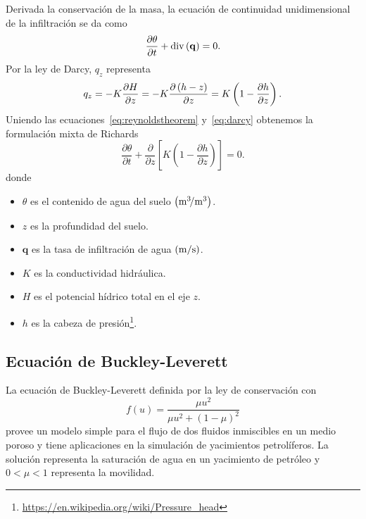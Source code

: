 Derivada la conservación de la masa, la ecuación de continuidad
unidimensional de la infiltración se da como~\cite{Tan2018}
\begin{equation}\label{eq:reynoldstheorem}
	\diffp{\theta}{t}+
	\operatorname{div}\left(\mathbf{q}\right)=
	0.
\end{equation}
Por la ley de Darcy, $q_{z}$ representa
\begin{equation}\label{eq:darcy}
	q_{z}=
	-K\diffp{H}{z}=
	-K\diffp{\left(h-z\right)}{z}=
	K\left(
	1-
	\diffp{h}{z}
	\right).
\end{equation}
Uniendo las ecuaciones~\eqref{eq:reynoldstheorem} y~\eqref{eq:darcy}
obtenemos la formulación mixta de Richards
\begin{equation*}
	\frac{\partial\theta}{\partial t}+
	\frac{\partial}{\partial z}
	\left[K\left(1-\frac{\partial h}{\partial z}\right)\right]=0.
\end{equation*}
donde
\begin{itemize}
	\item

	      $\theta$ es el contenido de agua del suelo $\left(\unit[per-mode=symbol]{\cubic\metre\per\cubic\metre}\right)$.

	\item

	      $z$ es la profundidad del suelo.

	\item

	      $\mathbf{q}$ es la tasa de infiltración de agua $\left(\unit[per-mode=symbol]{\metre\per\second}\right)$.

	\item

	      $K$ es la conductividad hidráulica.

	\item

	      $H$ es el potencial hídrico total en el eje $z$.

	\item

	      $h$ es la cabeza de presión\footnote{\url{https://en.wikipedia.org/wiki/Pressure_head}}.
\end{itemize}

\subsection*{Ecuación de Buckley-Leverett}

La ecuación de Buckley-Leverett definida por la ley de conservación
con
\begin{equation*}
	f\left(u\right)=
	\frac{\mu u^{2}}{\mu u^{2}+{\left(1-\mu\right)}^{2}}
\end{equation*}
provee un modelo simple para el flujo de dos fluidos inmiscibles en
un medio poroso y tiene aplicaciones en la simulación de yacimientos
petrolíferos.
La solución representa la saturación de agua en un yacimiento de
petróleo y $0<\mu<1$ representa la movilidad.

